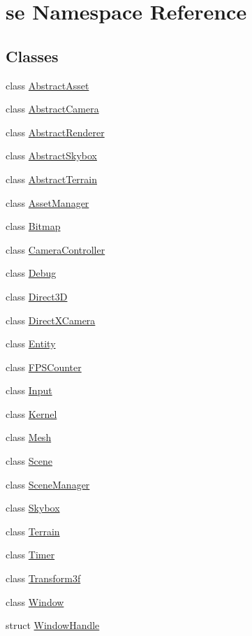 \hypertarget{namespacese}{}\section{se Namespace Reference}
\label{namespacese}
\subsection*{Classes}
\begin{DoxyCompactItemize}
\item 
class \mbox{\hyperlink{classse_1_1_abstract_asset}{Abstract\+Asset}}
\item 
class \mbox{\hyperlink{classse_1_1_abstract_camera}{Abstract\+Camera}}
\item 
class \mbox{\hyperlink{classse_1_1_abstract_renderer}{Abstract\+Renderer}}
\item 
class \mbox{\hyperlink{classse_1_1_abstract_skybox}{Abstract\+Skybox}}
\item 
class \mbox{\hyperlink{classse_1_1_abstract_terrain}{Abstract\+Terrain}}
\item 
class \mbox{\hyperlink{classse_1_1_asset_manager}{Asset\+Manager}}
\item 
class \mbox{\hyperlink{classse_1_1_bitmap}{Bitmap}}
\item 
class \mbox{\hyperlink{classse_1_1_camera_controller}{Camera\+Controller}}
\item 
class \mbox{\hyperlink{classse_1_1_debug}{Debug}}
\item 
class \mbox{\hyperlink{classse_1_1_direct3_d}{Direct3D}}
\item 
class \mbox{\hyperlink{classse_1_1_direct_x_camera}{Direct\+X\+Camera}}
\item 
class \mbox{\hyperlink{classse_1_1_entity}{Entity}}
\item 
class \mbox{\hyperlink{classse_1_1_f_p_s_counter}{F\+P\+S\+Counter}}
\item 
class \mbox{\hyperlink{classse_1_1_input}{Input}}
\item 
class \mbox{\hyperlink{classse_1_1_kernel}{Kernel}}
\item 
class \mbox{\hyperlink{classse_1_1_mesh}{Mesh}}
\item 
class \mbox{\hyperlink{classse_1_1_scene}{Scene}}
\item 
class \mbox{\hyperlink{classse_1_1_scene_manager}{Scene\+Manager}}
\item 
class \mbox{\hyperlink{classse_1_1_skybox}{Skybox}}
\item 
class \mbox{\hyperlink{classse_1_1_terrain}{Terrain}}
\item 
class \mbox{\hyperlink{classse_1_1_timer}{Timer}}
\item 
class \mbox{\hyperlink{classse_1_1_transform3f}{Transform3f}}
\item 
class \mbox{\hyperlink{classse_1_1_window}{Window}}
\item 
struct \mbox{\hyperlink{structse_1_1_window_handle}{Window\+Handle}}
\end{DoxyCompactItemize}
